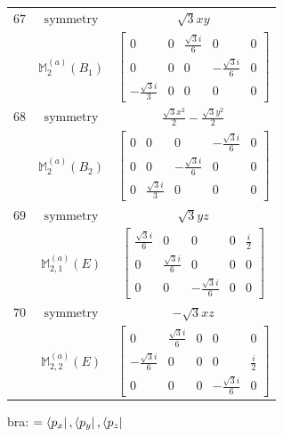 \documentclass[fleqn,8pt,landscape]{jsarticle}
\begin{document}
\begin{longtable}{ccc}
$ 67 $ & $ \text{symmetry} $ & $ \sqrt{3} x y $ \\
$  $ & $ \mathbb{M}_{2}^{(a)}(B_{1}) $ & $ \begin{bmatrix} 0 & 0 & \frac{\sqrt{3} i}{6} & 0 & 0 \\ 0 & 0 & 0 & - \frac{\sqrt{3} i}{6} & 0 \\ - \frac{\sqrt{3} i}{3} & 0 & 0 & 0 & 0 \end{bmatrix} $ \\ \hline
$ 68 $ & $ \text{symmetry} $ & $ \frac{\sqrt{3} x^{2}}{2} - \frac{\sqrt{3} y^{2}}{2} $ \\
$  $ & $ \mathbb{M}_{2}^{(a)}(B_{2}) $ & $ \begin{bmatrix} 0 & 0 & 0 & - \frac{\sqrt{3} i}{6} & 0 \\ 0 & 0 & - \frac{\sqrt{3} i}{6} & 0 & 0 \\ 0 & \frac{\sqrt{3} i}{3} & 0 & 0 & 0 \end{bmatrix} $ \\ \hline
$ 69 $ & $ \text{symmetry} $ & $ \sqrt{3} y z $ \\
$  $ & $ \mathbb{M}_{2,1}^{(a)}(E) $ & $ \begin{bmatrix} \frac{\sqrt{3} i}{6} & 0 & 0 & 0 & \frac{i}{2} \\ 0 & \frac{\sqrt{3} i}{6} & 0 & 0 & 0 \\ 0 & 0 & - \frac{\sqrt{3} i}{6} & 0 & 0 \end{bmatrix} $ \\ \hline
$ 70 $ & $ \text{symmetry} $ & $ - \sqrt{3} x z $ \\
$  $ & $ \mathbb{M}_{2,2}^{(a)}(E) $ & $ \begin{bmatrix} 0 & \frac{\sqrt{3} i}{6} & 0 & 0 & 0 \\ - \frac{\sqrt{3} i}{6} & 0 & 0 & 0 & \frac{i}{2} \\ 0 & 0 & 0 & - \frac{\sqrt{3} i}{6} & 0 \end{bmatrix} $ \\ \hline
\end{longtable}
bra: $=\bra{p_{x}}, \bra{p_{y}}, \bra{p_{z}}$
\end{document}

